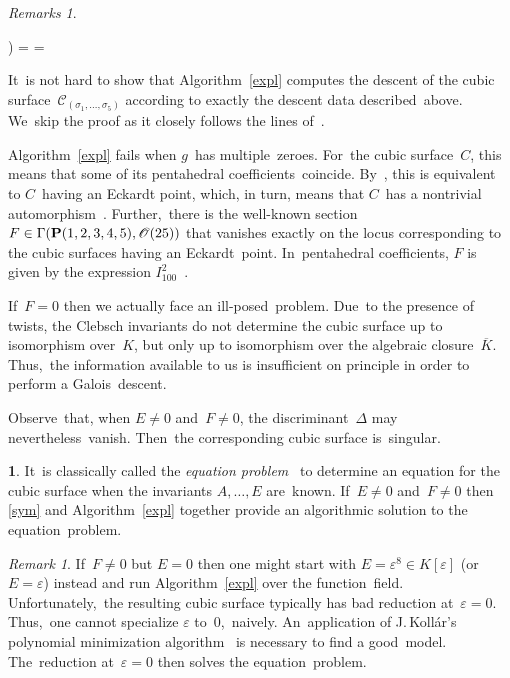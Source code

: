 \documentclass[reqno]{amsart}
\theoremstyle{definition}
\newtheorem{ttt}[theorem]{}
\theoremstyle{remark}
\newtheorem{rem}[theorem]{Remark}
\newtheorem{rems}[theorem]{Remarks}
\numberwithin{equation}{section}
\newcommand{\calC}{\mathscr{C}}
\newcommand{\calO}{\mathscr{O}}
\newcommand{\bP}{{\bf P}}
\newcounter{iii}
\newenvironment{iii}{\begin{list}{\rm \roman{iii}) }%
{\usecounter{iii} \leftmargin=0.0pt \labelsep=0.0pt %
\listparindent=0.0pt \labelwidth=0.0pt \parsep=\smallskipamount%
 \itemsep=0.0pt \topsep=0.0pt \partopsep=\smallskipamount}}{\end{list}}
\begin{document}
\begin{appendix}
\begin{rems}\smallskip
\label{tec}
\begin{iii}
\item
It~is not hard to show that Algorithm~\ref{expl} computes the descent of the cubic
surface~$\calC_{(\sigma_1, \ldots, \sigma_5)}$
according to exactly the descent data described~above. We~skip the proof as it closely follows the lines of~\cite[Theorem~6.6]{EJ2}.
\item
Algorithm~\ref{expl} fails when
$g$~has
multiple~zeroes. For~the cubic
surface~$C$,
this means that some of its pentahedral coefficients~coincide. By~\cite[Example~9.1.25]{Do}, this is equivalent to
$C$~having
an Eckardt point, which, in turn, means that
$C$~has
a nontrivial automorphism~\cite[Theorem~9.5.8]{Do}.
%
Further,~there is the well-known section
$F \in \Gamma(\bP(1,2,3,4,5), \calO(25))$
that vanishes exactly on the locus corresponding to the cubic surfaces having an Eckardt~point. In~pentahedral coefficients,
$F$
is given by the expression
$I_{100}^2$~\cite[section~9.4.5]{Do}.

If~$F = 0$
then we actually face an ill-posed~problem. Due~to the presence of twists, the Clebsch invariants do not determine the cubic surface up to isomorphism
over~$K$,
but only up to isomorphism over the algebraic
closure~$\overline{K}$.
Thus,~the information available to us is insufficient on principle in order to perform a Galois~descent.
\item
Observe~that, when
$E \neq 0$
and~$F \neq 0$,
the
discriminant~$\Delta$
may nevertheless~vanish. Then~the corresponding cubic surface is~singular.
\end{iii}
\end{rems}

\begin{ttt}\smallskip
It~is classically called the {\em equation problem\/}~\cite[Definition 4.1.17]{Hu} to determine an equation for the cubic surface when the invariants
$A, \ldots, E$
are~known.
If~$E \neq 0$
and~$F \neq 0$
then \ref{sym} and Algorithm~\ref{expl} together provide an algorithmic solution to the equation~problem.
\end{ttt}

\begin{rem}\smallskip
If~$F \neq 0$
but
$E = 0$
then one might start with
$E = \varepsilon^8 \in K[\varepsilon]$
(or
$E = \varepsilon$)
instead and run Algorithm~\ref{expl} over the function~field. Unfortunately,~the resulting cubic surface typically has bad reduction
at~$\varepsilon = 0$.
Thus,~one cannot specialize
$\varepsilon$
to~$0$,~naively.
An~application of J.\,Koll\'ar's polynomial minimization algorithm~\cite[in particular Proposition 6.4.2]{Ko} is necessary to find a good~model. The~reduction
at~$\varepsilon = 0$
then solves the equation~problem.
\end{rem}
\end{appendix}
\end{document}
